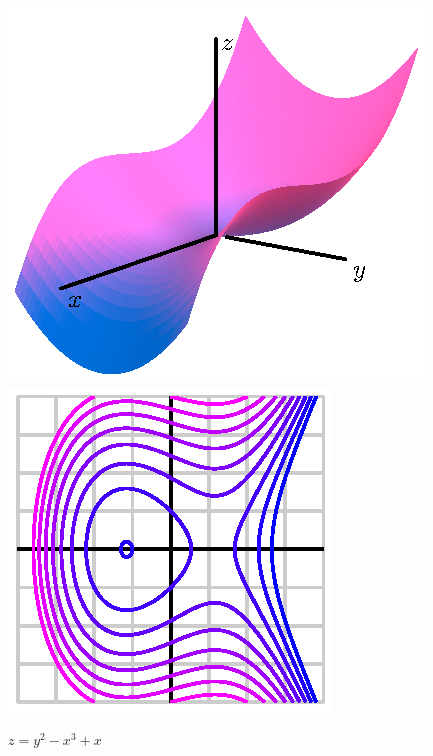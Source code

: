 \begin{figure}[ht]
  \begin{center}
    \includegraphics{figures/elliptic.eps}
    \hspace*{30pt}
    \includegraphics{figures/elliptic_contours.eps}
  \end{center}
  \caption{$z=y^2 - x^3 + x$}
\end{figure}
